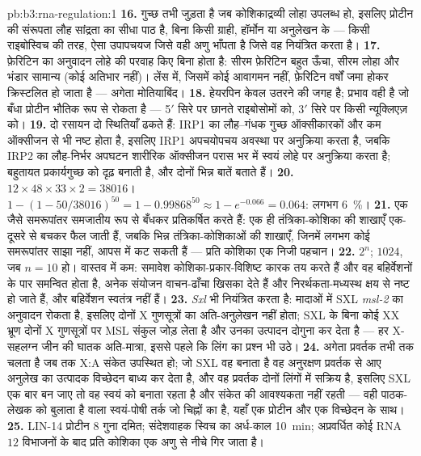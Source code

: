 \begin{solution}{pb:b3:rna-regulation:1}
\textbf{16.} गुच्छ तभी जुड़ता है जब कोशिकाद्रव्यी लोहा उपलब्ध हो,
इसलिए प्रोटीन की संरूपता लौह सांद्रता का सीधा पाठ है, बिना किसी ग्राही,
हॉर्मोन या अनुलेखन के --- किसी राइबोस्विच की तरह, ऐसा उपापचयज जिसे वही
अणु भाँपता है जिसे वह नियंत्रित करता है।
\textbf{17.} फ़ेरिटिन का अनुवादन लोहे की परवाह किए बिना होता है: सीरम
फ़ेरिटिन बहुत ऊँचा, सीरम लोहा और भंडार सामान्य (कोई अतिभार नहीं)। लेंस
में, जिसमें कोई आवागमन नहीं, फ़ेरिटिन वर्षों जमा होकर क्रिस्टलित हो
जाता है --- अगेता मोतियाबिंद।
\textbf{18.} हेयरपिन केवल उतरने की जगह है; प्रभाव वही है जो बँधा
प्रोटीन भौतिक रूप से रोकता है --- 5$'$ सिरे पर छानते राइबोसोमों को,
3$'$ सिरे पर किसी न्यूक्लिएज़ को।
\textbf{19.} दो रसायन दो स्थितियाँ ढकते हैं: IRP1 का लौह--गंधक गुच्छ
ऑक्सीकारकों और कम ऑक्सीजन से भी नष्ट होता है, इसलिए IRP1 अपचयोपचय
अवस्था पर अनुक्रिया करता है, जबकि IRP2 का लौह-निर्भर अपघटन शारीरिक
ऑक्सीजन परास भर में स्वयं लोहे पर अनुक्रिया करता है; बहुतायत
प्रकार्यगुच्छ को दृढ़ बनाती है, और दोनों भिन्न बातें बताते हैं।
\textbf{20.} $12\times 48\times 33\times 2 = \num{38016}$। $1 - (1 -
50/\num{38016})^{50} = 1 - 0.99868^{50} \approx 1 - e^{-0.066} =
0.064$: लगभग \qty{6}{\%}।
\textbf{21.} एक जैसे समरूपांतर समजातीय रूप से बँधकर प्रतिकर्षित करते
हैं: एक ही तंत्रिका-कोशिका की शाखाएँ एक-दूसरे से बचकर फैल जाती हैं,
जबकि भिन्न तंत्रिका-कोशिकाओं की शाखाएँ, जिनमें लगभग कोई समरूपांतर साझा
नहीं, आपस में कट सकती हैं --- प्रति कोशिका एक निजी पहचान।
\textbf{22.} $2^{n}$; $\num{1024}$, जब $n = 10$ हो। वास्तव में कम:
समावेश कोशिका-प्रकार-विशिष्ट कारक तय करते हैं और वह बहिर्वेशनों के पार
समन्वित होता है, अनेक संयोजन वाचन-ढाँचा खिसका देते हैं और
निरर्थकता-मध्यस्थ क्षय से नष्ट हो जाते हैं, और बहिर्वेशन स्वतंत्र नहीं हैं।
\textbf{23.} \emph{Sxl}  भी नियंत्रित करता है: मादाओं
में SXL \emph{msl-2} का अनुवादन रोकता है, इसलिए दोनों X गुणसूत्रों का
अति-अनुलेखन नहीं होता; SXL के बिना कोई XX भ्रूण दोनों X गुणसूत्रों पर
MSL संकुल जोड़ लेता है और उनका उत्पादन दोगुना कर देता है --- हर
X-सहलग्न जीन की घातक अति-मात्रा, इससे पहले कि लिंग का प्रश्न भी उठे।
\textbf{24.} अगेता प्रवर्तक तभी तक चलता है जब तक X:A संकेत उपस्थित हो;
जो SXL वह बनाता है वह अनुरक्षण प्रवर्तक से आए अनुलेख का उत्पादक
विच्छेदन बाध्य कर देता है, और वह प्रवर्तक दोनों लिंगों में सक्रिय है,
इसलिए SXL एक बार बन जाए तो वह स्वयं को बनाता रहता है और संकेत की
आवश्यकता नहीं रहती --- वही पाठक-लेखक को बुलाता है वाला स्वयं-पोषी
तर्क जो  चिह्नों का है, यहाँ एक प्रोटीन और एक विच्छेदन के साथ।
\textbf{25.} LIN-14 प्रोटीन $8$ गुना दमित; संदेशवाहक स्विच का
अर्ध-काल \qty{10}{min}; अप्रवर्धित कोई RNA $12$ विभाजनों के बाद प्रति
कोशिका एक अणु से नीचे गिर जाता है।
\end{solution}
